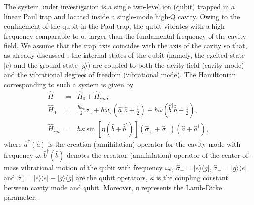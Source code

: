 \documentclass[twocolumn,3p,times]{elsarticle}
\begin{document}
The system under investigation is a single two-level ion (qubit) trapped in a linear Paul trap and located inside a single-mode high-Q cavity. Owing to the confinement of the qubit in the Paul trap, the qubit vibrates with a high frequency comparable to or larger than the fundamental frequency of the cavity field. We assume that the trap axis coincides with the axis of the cavity so that, as already discussed \cite{PRA562352,PRA64024305}, the internal states of the qubit (namely, the excited state $\lvert e\rangle$ and the ground state $\lvert g\rangle$) are coupled to both the cavity field (cavity mode) and the vibrational degrees of freedom (vibrational mode). The Hamiltonian corresponding to such a system is given by
\setlength\arraycolsep{1.4pt}\begin{eqnarray}
\label{eq:1}
\hat{H}&=&\hat{H}_{0} +\hat{H}_{int},\nonumber\\
\hat{H}_{0}&=& \frac{\hbar\omega_{0}}{2}\sigma_{z}+\hbar\omega_\mathrm{v}\left(\hat{a}^{\dagger}\hat{a}+\frac{1}{2}\right)+\hbar\omega\left(\hat{b}^{\dagger}\hat{b}+\frac{1}{2}\right), \nonumber \\
\hat{H}_{int}&=& \hbar \kappa \sin[\eta(\hat{b}+\hat{b}^{\dagger})](\hat{\sigma}_{+}+\hat{\sigma}_{-})(\hat{a}+\hat{a}^{\dagger}),
\end{eqnarray} 
where $\hat{a}^{\dagger}(\hat{a})$ is the creation (annihilation) operator for the cavity mode with frequency $\omega$, $\hat{b}^{\dagger}(\hat{b})$ denotes the creation (annihilation) operator of the center-of-mass vibrational motion of the qubit with frequency $\omega_\mathrm{v}$, $\hat{\sigma}_{+}=\lvert e\rangle \langle g\rvert$, $\hat{\sigma}_{-}=\lvert g\rangle \langle e\rvert$ and $\hat{\sigma}_{z}=\lvert e\rangle \langle e\rvert-\lvert g\rangle \langle g\rvert$ are the qubit operators, $\kappa$ is the coupling constant between cavity mode and qubit. Moreover, $\eta$ represents the Lamb-Dicke parameter.
\end{document}
